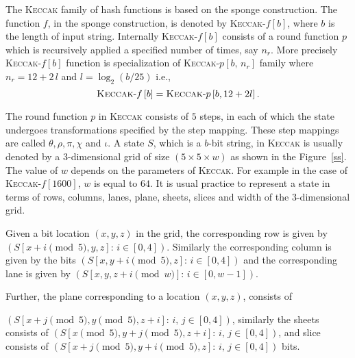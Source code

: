 \documentclass[runningheads]{llncs}
\newcommand{\Keccak}{\mbox{\textsc{Keccak}}}
\begin{document}
The \Keccak{} family of hash functions is based on the sponge construction. The function $f$, in the sponge construction, is denoted by \Keccak-$f\left[b\right]$, where $b$ is the length of input string. Internally \Keccak-$f\left[b\right]$ consists of a round function $p$ which is recursively applied a specified number of times, say $n_r$. More precisely \Keccak-$f\left[b\right]$ function is specialization of \Keccak-$p\left[b,\,n_r\right]$ family where $n_r = 12 + 2\,l$ and $l = \log_2 (b/25)$ i.e.,
\[
	\Keccak\text{-}f\left[b\right] = \Keccak\text{-}p\left[b,  12 + 2l\right].
\]

The round function $p$ in \Keccak{} consists of $5$ steps, in each of which the state undergoes transformations specified by the step mapping. These step mappings are called $\theta, \rho, \pi, \chi$ and  $\iota$. A state $S$, which is a $b$-bit string, in \Keccak{} is usually denoted by a $3$-dimensional grid of size $(5 \times 5 \times w)$ as shown in the Figure~\ref{ss}. The value of $w$ depends on the parameters of \Keccak{}. For example in the case of \Keccak-$f\left[1600\right]$, $w$ is equal to $64$. It is usual practice to represent a state in terms of rows, columns, lanes, plane, sheets, slices and width of the $3$-dimensional grid.

Given a bit location $(x,y,z)$ in the grid, the corresponding row is given by $\left( S[x+i \pmod 5,y,z] : \, i \in [0,4] \right)$. Similarly the corresponding column is given by the bits $\left( S[x,y+i \pmod 5,z] : \, i \in [0,4] \right)$ and the corresponding lane is given by $\left( S[x,y,z+i \pmod w] : \, i \in [0,w-1] \right)$. 

Further, the plane corresponding to a location $(x,y,z)$, consists of

$\left( S[x+j \pmod 5,y \pmod 5,z + i] : \, i,\,j \in [0,4] \right)$, similarly the sheets consists of $\left( S[x \pmod 5,y+j \pmod 5,z + i] : \, i,\,j \in [0,4] \right)$, and slice consists of $\left( S[x+j \pmod 5,y+i \pmod 5,z] : \, i,\,j \in [0,4] \right)$ bits.
\end{document}
